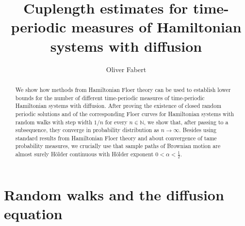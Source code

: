 \documentclass[a4paper,11pt]{amsart}
\title{Cuplength estimates for time-periodic measures of Hamiltonian systems with diffusion}
\author{Oliver Fabert}
\newcommand{\NN}{\mathbb{N}}
\begin{document}
\maketitle

\begin{abstract} We show how methods from Hamiltonian Floer theory can be used to establish lower bounds for the number of different time-periodic measures of time-periodic Hamiltonian systems with diffusion. After proving the existence of closed random periodic solutions and of the corresponding Floer curves for Hamiltonian systems with random walks with step width $1/n$ for every $n\in\NN$, we show that, after passing to a subsequence, they converge in probability distribution as $n\to\infty$. Besides using standard results from Hamiltonian Floer theory and about convergence of tame probability measures, we crucially use that sample paths of Brownian motion are almost surely H\"older continuous with H\"older exponent $0<\alpha<\frac{1}{2}$. \end{abstract}

\tableofcontents
{} 

\section{Random walks and the diffusion equation}\label{section 1}
\end{document}

